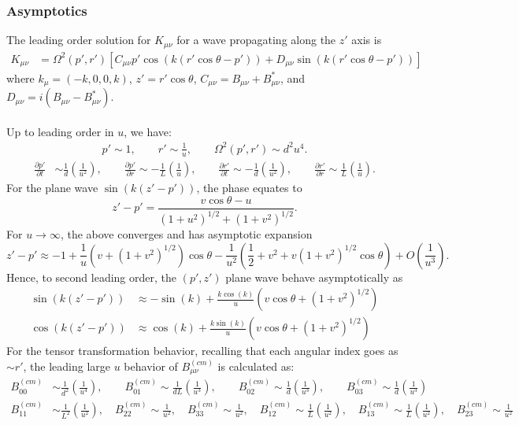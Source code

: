 \documentclass[10pt,letterpaper]{article}
\begin{document}
\subsubsection*{Asymptotics}
The leading order solution for $K_{\mu\nu}$ for a wave propagating along the $z'$ axis is
\begin{align}
K_{\mu\nu} &= \Omega^2(p',r')\left[ C_{\mu\nu} p' \cos(k(r'\cos\theta - p')) + D_{\mu\nu} \sin(k(r'\cos\theta - p')) \right]
\end{align}
where $k_{\mu} = (-k,0,0,k)$, $z' = r'\cos\theta$, $C_{\mu\nu} = B_{\mu\nu}+B^*_{\mu\nu} $, and $D_{\mu\nu} = i(B_{\mu\nu}-B^*_{\mu\nu})$.
\\ \\
Up to leading order in $u$, we have:
\begin{align}
p'\sim 1,\qquad r' \sim \frac{1}{u},\qquad \Omega^2(p',r') \sim d^2 u^4.
\end{align}
\begin{align}
\frac{\partial p'}{\partial t} & \sim \frac{1}{d}\left( \frac{1}{u^2}\right),\qquad
\frac{\partial p'}{\partial r}  \sim 	-\frac{1}{L} \left(\frac{1}{u}\right),\qquad
\frac{\partial r'}{\partial t}  \sim -\frac{1}{d}\left( \frac{1}{u^2}\right),\qquad
\frac{\partial r'}{\partial r}  \sim \frac{1}{L}\left( \frac{1}{u}\right).
\end{align}
For the plane wave $\sin(k(z'-p'))$, the phase equates to
\begin{equation}
z'-p' = \frac{v\cos\theta - u}{(1+u^2)^{1/2}+(1+v^2)^{1/2}}.
\end{equation}
For $u \to \infty$, the above converges and has asymptotic expansion
\begin{equation}
z'-p' \approx -1 + \frac{1}{u}(v+(1+v^2)^{1/2})\cos\theta - \frac{1}{u^2}\left( \frac12 + v^2 +v(1+v^2)^{1/2}\cos\theta\right) +  O\left( \frac{1}{u^3}\right).
\end{equation}
Hence, to second leading order, the $(p',z')$ plane wave behave asymptotically as
\begin{align}
\sin(k(z'-p')) &\approx -\sin(k) + \frac{k\cos(k)}{u}(v\cos\theta+(1+v^2)^{1/2})\nonumber\\
\cos(k(z'-p'))&\approx \cos(k) + \frac{k\sin(k)}{u}(v\cos\theta+(1+v^2)^{1/2})
\end{align}
For the tensor transformation behavior, recalling that each angular index goes as $\sim r'$, the leading large $u$ behavior of $B_{\mu\nu}^{(cm)}$ is calculated as:
\begin{align}
B^{(cm)}_{00} &\sim \frac{1}{d^2}\left( \frac{1}{u^4}\right),\qquad 
B^{(cm)}_{01} \sim \frac{1}{dL}\left( \frac{1}{u^3}\right),\qquad 
B^{(cm)}_{02} \sim \frac{1}{d}\left( \frac{1}{u^3}\right),\qquad 
B^{(cm)}_{03} \sim \frac{1}{d}\left( \frac{1}{u^3}\right) \\
B^{(cm)}_{11} &\sim \frac{1}{L^2}\left( \frac{1}{u^2}\right),\quad 
B^{(cm)}_{22} \sim \frac{1}{u^2},\quad 
B^{(cm)}_{33} \sim \frac{1}{u^2} ,\quad 
B^{(cm)}_{12} \sim \frac{1}{L}\left( \frac{1}{u^2}\right) ,\quad 
B^{(cm)}_{13} \sim \frac{1}{L}\left( \frac{1}{u^2}\right) ,\quad 
B^{(cm)}_{23} \sim \frac{1}{u^2}\nonumber
\end{align}
\end{document}
